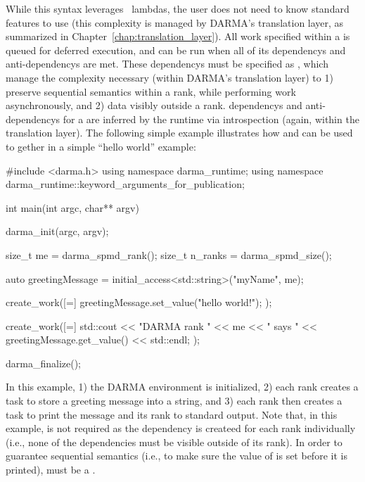 While this syntax leverages \CC\ lambdas, the user does not need to know 
standard features to use  (this
complexity is managed by DARMA's translation layer, as summarized in
Chapter~\ref{chap:translation_layer}).  All work specified within a
 is queued for deferred execution, and can be run when
all of its \glspl{dependency} and \glspl{anti-dependency} are met.  
These \glspl{dependency} must be specified as , 
which manage the complexity necessary (within DARMA's \gls{translation layer}) to 1) preserve \gls{sequential
semantics} within a \gls{rank}, while performing work asynchronously, and 2) 
 data visibly outside a \gls{rank}.
\Glspl{dependency} and \glspl{anti-dependency} for a 
 are inferred by the runtime via
\gls{introspection} (again, within the \gls{translation layer}). 
The following simple example illustrates how  and
 can be used to gether in a simple ``hello world''
example:


\begin{CppCode}
#include <darma.h>
using namespace darma_runtime;
using namespace darma_runtime::keyword_arguments_for_publication;

int main(int argc, char** argv) {

  darma_init(argc, argv);

  size_t me = darma_spmd_rank();
  size_t n_ranks = darma_spmd_size();

  auto greetingMessage = initial_access<std::string>("myName", me);

  create_work([=]
  {
    greetingMessage.set_value("hello world!");
  });

  create_work([=]
  {
    std::cout << "DARMA rank " << me << " says " 
              << greetingMessage.get_value() << std::endl;
  });

  darma_finalize();

}
\end{CppCode}

In this example, 1) the DARMA environment is initialized, 2) each rank creates a
task to store a greeting message into a string, and 3) each rank then creates a
task to print the message and its rank to standard output.
Note that, in this example,  is not required as the
dependency  is createed for each rank individually
(i.e., none of the dependencies must be visible outside of its rank).
In order to guarantee \gls{sequential semantics} (i.e., to make sure the value
of  is set before it is printed),
 must be a .



